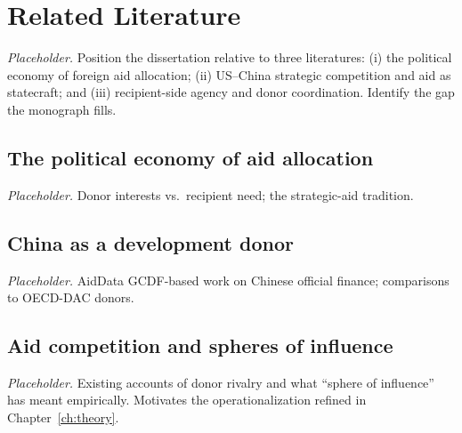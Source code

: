 \chapter{Related Literature}
\label{ch:lit}

\textit{Placeholder.} Position the dissertation relative to three literatures:
(i) the political economy of foreign aid allocation; (ii) US--China strategic
competition and aid as statecraft; and (iii) recipient-side agency and donor
coordination. Identify the gap the monograph fills.

\section{The political economy of aid allocation}
\textit{Placeholder.} Donor interests vs.\ recipient need; the strategic-aid
tradition.

\section{China as a development donor}
\textit{Placeholder.} AidData GCDF-based work on Chinese official finance;
comparisons to OECD-DAC donors.

\section{Aid competition and spheres of influence}
\textit{Placeholder.} Existing accounts of donor rivalry and what ``sphere of
influence'' has meant empirically. Motivates the operationalization refined in
Chapter~\ref{ch:theory}.

